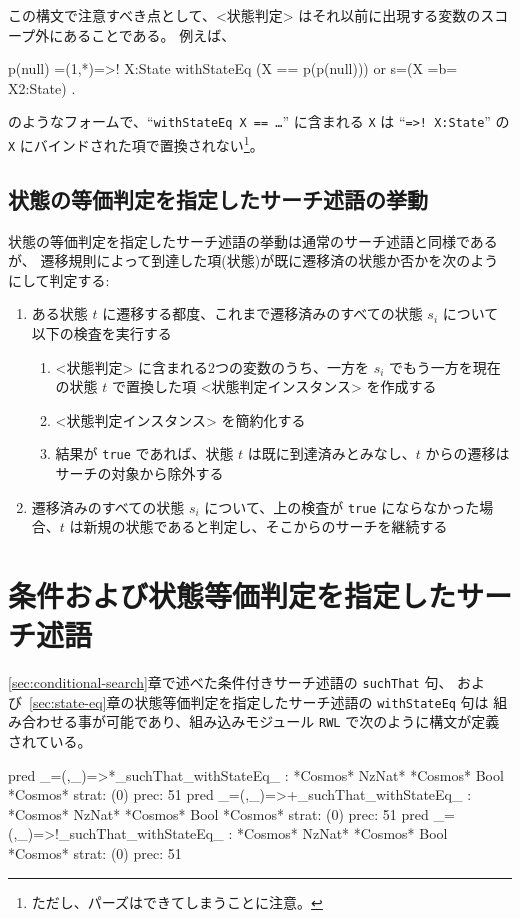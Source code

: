 \documentclass{article}
\begin{document}
この構文で注意すべき点として、<状態判定> はそれ以前に出現する変数のスコープ外にあることである。
例えば、
\begin{simplev}
 p(null) =(1,*)=>! X:State withStateEq (X == p(p(null))) or s=(X =b= X2:State) .
\end{simplev}
のようなフォームで、``\texttt{withStateEq X == \ldots}'' に含まれる \texttt{X}  は ``\verb|=>! X:State|'' の \texttt{X} にバインドされた項で置換されない\footnote{ただし、パーズはできてしまうことに注意。}。

\subsection{状態の等価判定を指定したサーチ述語の挙動}
\label{sec:state-eq-behaviour}

状態の等価判定を指定したサーチ述語の挙動は通常のサーチ述語と同様であるが、
遷移規則によって到達した項(状態)が既に遷移済の状態か否かを次のようにして判定する:
\begin{enumerate}
\item ある状態 $t$ に遷移する都度、これまで遷移済みのすべての状態 $s_i$ について以下の検査を実行する
\begin{enumerate}
  \item <状態判定> に含まれる2つの変数のうち、一方を $s_i$ でもう一方を現在の状態 $t$ で置換した項 <状態判定インスタンス> を作成する
  \item <状態判定インスタンス> を簡約化する
  \item 結果が \texttt{true} であれば、状態 $t$ は既に到達済みとみなし、$t$ からの遷移はサーチの対象から除外する
\end{enumerate}

\item 遷移済みのすべての状態 $s_i$ について、上の検査が \texttt{true} にならなかった場合、$t$ は新規の状態であると判定し、そこからのサーチを継続する
\end{enumerate}

\section{条件および状態等価判定を指定したサーチ述語}
\label{sec:cond+state-eq}
\ref{sec:conditional-search}章で述べた条件付きサーチ述語の \texttt{suchThat} 句、
および~\ref{sec:state-eq}章の状態等価判定を指定したサーチ述語の \texttt{withStateEq} 句は%
組み合わせる事が可能であり、組み込みモジュール \texttt{RWL} で次のように構文が定義されている。

\begin{simplev}
 pred _=(,_)=>*_suchThat_withStateEq_ : *Cosmos* NzNat* *Cosmos* Bool *Cosmos*
      { strat: (0) prec: 51 }
 pred _=(,_)=>+_suchThat_withStateEq_ : *Cosmos* NzNat* *Cosmos* Bool *Cosmos*
      { strat: (0) prec: 51 }
 pred _=(,_)=>!_suchThat_withStateEq_ : *Cosmos* NzNat* *Cosmos* Bool *Cosmos*
      { strat: (0) prec: 51 }
\end{simplev}
\end{document}
